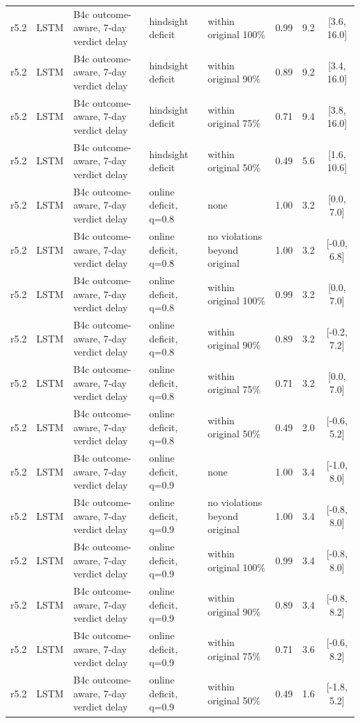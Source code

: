 \documentclass[10pt,onecolumn,letterpaper]{article}
\begin{document}
\begin{longtable}{lllp{4.2cm}p{3.4cm}ccc}
r5.2 & LSTM & B4c outcome-aware, 7-day verdict delay & hindsight deficit & within original 100\% & 0.99 & 9.2 & [3.6, 16.0] \\
r5.2 & LSTM & B4c outcome-aware, 7-day verdict delay & hindsight deficit & within original 90\% & 0.89 & 9.2 & [3.4, 16.0] \\
r5.2 & LSTM & B4c outcome-aware, 7-day verdict delay & hindsight deficit & within original 75\% & 0.71 & 9.4 & [3.8, 16.0] \\
r5.2 & LSTM & B4c outcome-aware, 7-day verdict delay & hindsight deficit & within original 50\% & 0.49 & 5.6 & [1.6, 10.6] \\
r5.2 & LSTM & B4c outcome-aware, 7-day verdict delay & online deficit, q=0.8 & none & 1.00 & 3.2 & [0.0, 7.0] \\
r5.2 & LSTM & B4c outcome-aware, 7-day verdict delay & online deficit, q=0.8 & no violations beyond original & 1.00 & 3.2 & [-0.0, 6.8] \\
r5.2 & LSTM & B4c outcome-aware, 7-day verdict delay & online deficit, q=0.8 & within original 100\% & 0.99 & 3.2 & [0.0, 7.0] \\
r5.2 & LSTM & B4c outcome-aware, 7-day verdict delay & online deficit, q=0.8 & within original 90\% & 0.89 & 3.2 & [-0.2, 7.2] \\
r5.2 & LSTM & B4c outcome-aware, 7-day verdict delay & online deficit, q=0.8 & within original 75\% & 0.71 & 3.2 & [0.0, 7.0] \\
r5.2 & LSTM & B4c outcome-aware, 7-day verdict delay & online deficit, q=0.8 & within original 50\% & 0.49 & 2.0 & [-0.6, 5.2] \\
r5.2 & LSTM & B4c outcome-aware, 7-day verdict delay & online deficit, q=0.9 & none & 1.00 & 3.4 & [-1.0, 8.0] \\
r5.2 & LSTM & B4c outcome-aware, 7-day verdict delay & online deficit, q=0.9 & no violations beyond original & 1.00 & 3.4 & [-0.8, 8.0] \\
r5.2 & LSTM & B4c outcome-aware, 7-day verdict delay & online deficit, q=0.9 & within original 100\% & 0.99 & 3.4 & [-0.8, 8.0] \\
r5.2 & LSTM & B4c outcome-aware, 7-day verdict delay & online deficit, q=0.9 & within original 90\% & 0.89 & 3.4 & [-0.8, 8.2] \\
r5.2 & LSTM & B4c outcome-aware, 7-day verdict delay & online deficit, q=0.9 & within original 75\% & 0.71 & 3.6 & [-0.6, 8.2] \\
r5.2 & LSTM & B4c outcome-aware, 7-day verdict delay & online deficit, q=0.9 & within original 50\% & 0.49 & 1.6 & [-1.8, 5.2] \\

\end{longtable}
\end{document}
